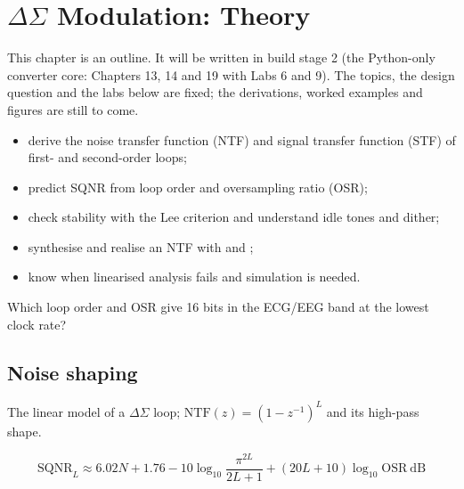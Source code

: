 \chapter{$\Delta\Sigma$ Modulation: Theory}\label{ch:dstheory}

\begin{specnote}
This chapter is an outline. It will be written in build stage 2 (the Python-only converter core: Chapters 13, 14 and 19 with Labs 6 and 9). The topics, the design question and the labs below are fixed; the derivations, worked examples and figures are still to come.
\end{specnote}

\begin{objectives}
\begin{itemize}
  \item derive the noise transfer function (NTF) and signal transfer function (STF) of first- and second-order loops;
  \item predict SQNR from loop order and oversampling ratio (OSR);
  \item check stability with the Lee criterion and understand idle tones and dither;
  \item synthesise and realise an NTF with  and ;
  \item know when linearised analysis fails and simulation is needed.
\end{itemize}
\end{objectives}

\begin{insight}
Which loop order and OSR give 16 bits in the ECG/EEG band at the lowest clock rate?
\end{insight}

\section{Noise shaping}\label{sec:ch19-1}
The linear model of a $\Delta\Sigma$ loop; $\mathrm{NTF}(z) = (1-z^{-1})^L$ and its high-pass shape.

\begin{keyeq}
\begin{equation}
  \mathrm{SQNR}_{L} \approx 6.02N + 1.76 - 10\log_{10}\!\frac{\pi^{2L}}{2L+1} + (20L+10)\log_{10}\mathrm{OSR}\ \mathrm{dB}
  \label{eq:dssqnr}
\end{equation}
\end{keyeq}

